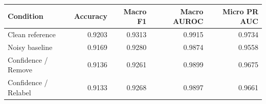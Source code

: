\begin{tabular}{lrrrr}
\toprule
Condition & Accuracy & Macro F1 & Macro AUROC & Micro PR AUC \\
\midrule
Clean reference & 0.9203 & 0.9313 & 0.9915 & 0.9734 \\
Noisy baseline & 0.9169 & 0.9280 & 0.9874 & 0.9558 \\
Confidence / Remove & 0.9136 & 0.9261 & 0.9899 & 0.9675 \\
Confidence / Relabel & 0.9133 & 0.9268 & 0.9897 & 0.9661 \\
\bottomrule
\end{tabular}
